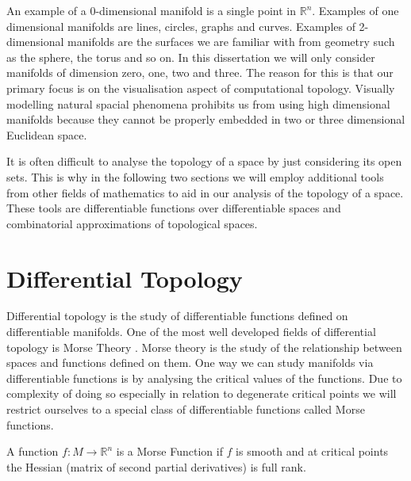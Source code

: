 An example of a 0-dimensional manifold is a single point in $\mathbb{R}^n$. Examples of one dimensional manifolds are lines, circles, graphs and curves. Examples of 2-dimensional manifolds are the surfaces we are familiar with from geometry such as the sphere, the torus and so on. In this dissertation we will only consider manifolds of dimension zero, one, two and three. The reason for this is that our primary focus is on the visualisation aspect of computational topology. Visually modelling natural spacial phenomena prohibits us from using high dimensional manifolds because they cannot be properly embedded in two or three dimensional Euclidean space.


It is often difficult to analyse the topology of a space by just considering its open sets. This is why in the following two sections we will employ additional tools from other fields of mathematics to aid in our analysis of the topology of a space. These tools are differentiable functions over differentiable spaces and combinatorial approximations of topological spaces.


\section{Differential Topology}

Differential topology is the study of differentiable functions defined on differentiable manifolds. One of the most well developed fields of differential topology is Morse Theory \cite{morse-theory-book, morse-theory-book-milnor}. Morse theory is the study of the relationship between spaces and functions defined on them. One way we can study manifolds via differentiable functions is by analysing the critical values of the functions. Due to complexity of doing so especially in relation to degenerate critical points we will restrict ourselves to a special class of differentiable functions called Morse functions.



\begin{defn} A function $f: M \to \mathbb{R}^n$ is a Morse Function if $f$ is smooth and at critical points the Hessian (matrix of second partial derivatives) is full rank.   \end{defn}


